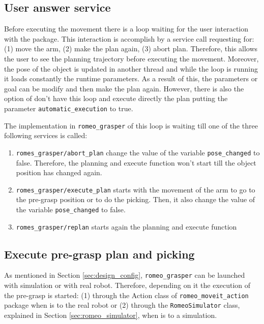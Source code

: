 \documentclass[12pt,a4paper,final,twoside,openright]{report}
\begin{document}
\subsection{User answer service}
\label{sec:user_service}
\vspace{-10pt}
Before executing the movement there is a loop waiting for the user interaction with the package. This interaction is accomplish by a service call requesting for: (1) move the arm, (2) make the plan again, (3) abort plan. Therefore, this allows the user to see the planning trajectory before executing the movement. Moreover, the pose of the object is updated in another thread and while the loop is running it loads constantly the runtime parameters. As a result of this, the parameters or goal can be modify and then make the plan again. However, there is also the option of don't have this loop and execute directly the plan putting the parameter \texttt{automatic\_execution} to true. 

The implementation in \texttt{romeo\_grasper} of this loop is waiting till one of the three following services is called:
\begin{enumerate}
\item \texttt{romes\_grasper/abort\_plan} change the value of the variable \texttt{pose\_changed} to false. Therefore, the planning and execute function won't start till the object position has changed again.
\item \texttt{romes\_grasper/execute\_plan} starts with the movement of the arm to go to the pre-grasp position or to do the picking. Then, it also change the value of the variable \texttt{pose\_changed} to false.
\item \texttt{romes\_grasper/replan} starts again the planning and execute function
\end{enumerate}

\subsection{Execute pre-grasp plan and picking}

As mentioned in Section \ref{sec:design_config}, \texttt{romeo\_grasper} can be launched with simulation or with real robot. Therefore, depending on it the execution of the pre-grasp is started: (1) through the Action class of \texttt{romeo\_moveit\_action} package when is to the real robot or (2) through the \texttt{RomeoSimulator} class, explained in Section \ref{sec:romeo_simulator}, when is to a simulation. 
\end{document}
